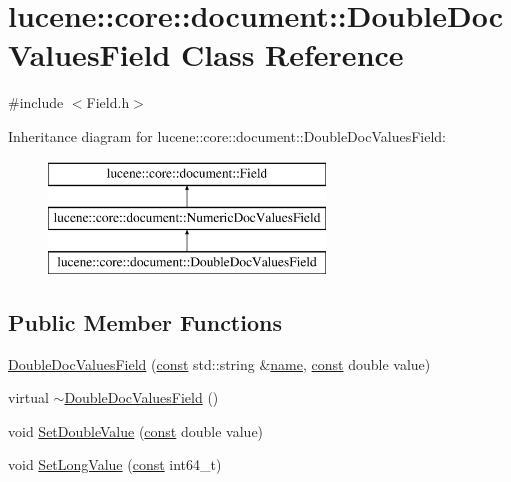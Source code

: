 \hypertarget{classlucene_1_1core_1_1document_1_1DoubleDocValuesField}{}\section{lucene\+:\+:core\+:\+:document\+:\+:Double\+Doc\+Values\+Field Class Reference}
\label{classlucene_1_1core_1_1document_1_1DoubleDocValuesField}


{\ttfamily \#include $<$Field.\+h$>$}

Inheritance diagram for lucene\+:\+:core\+:\+:document\+:\+:Double\+Doc\+Values\+Field\+:\begin{figure}[H]
\begin{center}
\leavevmode
\includegraphics[height=3.000000cm]{classlucene_1_1core_1_1document_1_1DoubleDocValuesField}
\end{center}
\end{figure}
\subsection*{Public Member Functions}
\begin{DoxyCompactItemize}
\item 
\mbox{\hyperlink{classlucene_1_1core_1_1document_1_1DoubleDocValuesField_a8b2140f651ea5578821571a6d8e22df6}{Double\+Doc\+Values\+Field}} (\mbox{\hyperlink{ZlibCrc32_8h_a2c212835823e3c54a8ab6d95c652660e}{const}} std\+::string \&\mbox{\hyperlink{classlucene_1_1core_1_1document_1_1Field_a52f673f3b3abb14b180f5159f4726537}{name}}, \mbox{\hyperlink{ZlibCrc32_8h_a2c212835823e3c54a8ab6d95c652660e}{const}} double value)
\item 
virtual \mbox{\hyperlink{classlucene_1_1core_1_1document_1_1DoubleDocValuesField_a365cb3b8018a3d6329b96a5d52509455}{$\sim$\+Double\+Doc\+Values\+Field}} ()
\item 
void \mbox{\hyperlink{classlucene_1_1core_1_1document_1_1DoubleDocValuesField_a1fe376e9158ee03034fd48fe259926ea}{Set\+Double\+Value}} (\mbox{\hyperlink{ZlibCrc32_8h_a2c212835823e3c54a8ab6d95c652660e}{const}} double value)
\item 
void \mbox{\hyperlink{classlucene_1_1core_1_1document_1_1DoubleDocValuesField_ab51b275ef2d23c248e945f4747a6dd6e}{Set\+Long\+Value}} (\mbox{\hyperlink{ZlibCrc32_8h_a2c212835823e3c54a8ab6d95c652660e}{const}} int64\+\_\+t)
\end{DoxyCompactItemize}
